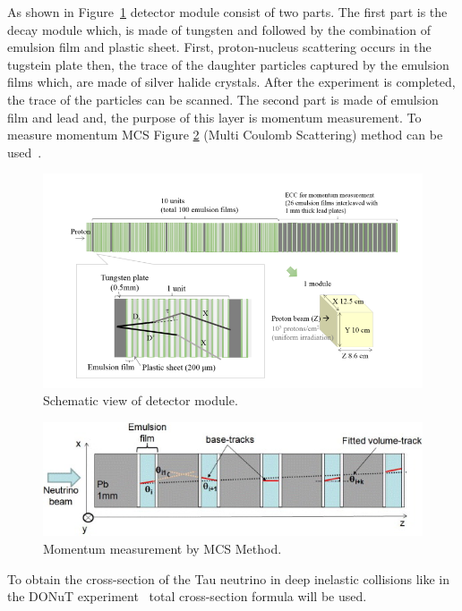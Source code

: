 \documentclass[12pt]{report}
\begin{document}
As shown in Figure~\ref{fig:detector} detector module consist of two parts. The first part is the decay module which, is made of tungsten and followed by the combination of emulsion film and plastic sheet. First, proton-nucleus scattering occurs in the tugstein plate then, the trace of the daughter particles captured by the emulsion films which, are made of silver halide crystals. After the experiment is completed, the trace of the particles can be scanned. The second part is made of emulsion film and lead and, the purpose of this layer is momentum measurement. To measure momentum MCS Figure \ref{fig:MCS} (Multi Coulomb Scattering) method can be used~\cite{Agafonova_2012}.

\begin{figure}[htp]
\centering
\includegraphics[width = \linewidth]{detector.png}
\caption{Schematic view of detector module.~\cite[p.~6]{aoki_ariga_dmitrievsky_firu_forshaw_fukuda_gornushkin_guler_haiduc_2019}}
\label{fig:detector}
\end{figure}

\begin{figure}[htp]
\centering
\includegraphics[width = \linewidth]{MCS.jpg}
\caption{Momentum measurement by MCS Method.~\cite[p.~6]{Agafonova_2012}}
\label{fig:MCS}
\end{figure}

To obtain the cross-section of the Tau neutrino in deep inelastic collisions like in the DONuT experiment~\cite{kodama_ushida_andreopoulos_saoulidou_tzanakos_yager_baller_boehnlein_freeman_lundberg_2016} total cross-section formula will be used. 
\end{document}

